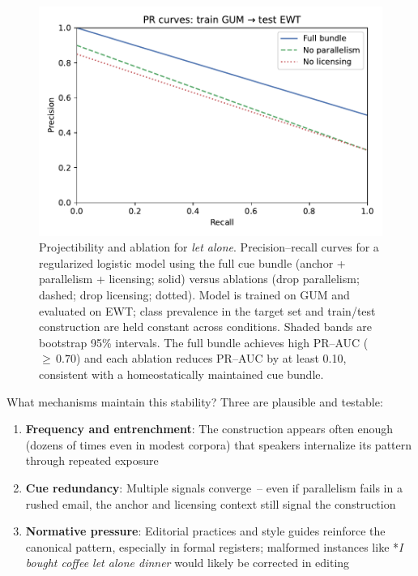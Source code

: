 \documentclass[12pt]{article}
\begin{document}
\begin{figure}[t]
  \centering
  \includegraphics[width=\linewidth]{images/let_alone_prcurve.pdf}
  \caption{Projectibility and ablation for \textit{let alone}. Precision–recall curves for a regularized logistic model using the full cue bundle (anchor + parallelism + licensing; solid) versus ablations (drop parallelism; dashed; drop licensing; dotted). Model is trained on GUM and evaluated on EWT; class prevalence in the target set and train/test construction are held constant across conditions. Shaded bands are bootstrap 95\% intervals. The full bundle achieves high PR–AUC ($\geq\,0.70$) and each ablation reduces PR–AUC by at least 0.10, consistent with a homeostatically maintained cue bundle.}
  \label{fig:let-alone-pr}
\end{figure}

\bigskip

What mechanisms maintain this stability? Three are plausible and testable:
\begin{enumerate}
\item \textbf{Frequency and entrenchment}: The construction appears often enough (dozens of times even in modest corpora) that speakers internalize its pattern through repeated exposure
\item \textbf{Cue redundancy}: Multiple signals converge~-- even if parallelism fails in a rushed email, the anchor and licensing context still signal the construction
\item \textbf{Normative pressure}: Editorial practices and style guides reinforce the canonical pattern, especially in formal registers; malformed instances like *\textit{I bought coffee let alone dinner} would likely be corrected in editing
\end{enumerate}
\end{document}
